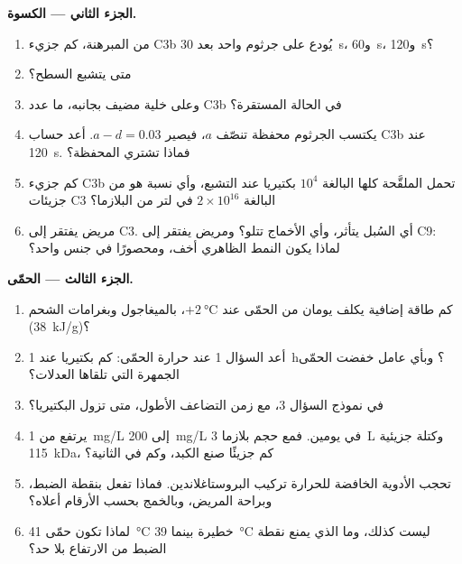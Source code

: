 \begin{problem}
\medskip
\noindent\textbf{الجزء الثاني --- الكسوة.}
\begin{enumerate}[resume]
  \item من المبرهنة، كم جزيء C3b يُودع على جرثوم واحد بعد
        \qty{30}{s}، و\qty{60}{s}، و\qty{120}{s}؟
  \item متى يتشبع السطح؟
  \item وعلى خلية مضيف بجانبه، ما عدد C3b في الحالة
        المستقرة؟
  \item يكتسب الجرثوم محفظة تنصّف $a$، فيصير $a -
        d = 0.03$. أعد حساب C3b عند \qty{120}{s}. فماذا تشتري
        المحفظة؟
  \item كم جزيء C3b تحمل الملقَّحة كلها البالغة $10^{4}$
        بكتيريا عند التشبع، وأي نسبة هو من جزيئات C3 البالغة
        $2\times 10^{16}$ في لتر من البلازما؟
  \item مريض يفتقر إلى C3. أي السُبل يتأثر، وأي الأخماج
        تتلو؟ ومريض يفتقر إلى C9: لماذا يكون النمط الظاهري
        أخف، ومحصورًا في جنس واحد؟
\end{enumerate}

\medskip
\noindent\textbf{الجزء الثالث --- الحمّى.}
\begin{enumerate}[resume]
  \item كم طاقة إضافية يكلف يومان من الحمّى عند
        $+\qty{2}{\celsius}$، بالميغاجول وبغرامات الشحم
        (\qty{38}{kJ/g})؟
  \item أعد السؤال 1 عند حرارة الحمّى: كم بكتيريا عند
        \qty{1}{h}؟ وبأي عامل خفضت الحمّى الجمهرة التي
        تلقاها العدلات؟
  \item في نموذج السؤال 3، مع زمن التضاعف الأطول، متى تزول
        البكتيريا؟
  \item يرتفع  من \qty{1}{mg/L} إلى
        \qty{200}{mg/L} في يومين. فمع حجم بلازما \qty{3}{L}
        وكتلة جزيئية \qty{115}{kDa}، كم جزيئًا صنع الكبد، وكم
        في الثانية؟
  \item تحجب الأدوية الخافضة للحرارة تركيب البروستاغلاندين.
        فماذا تفعل بنقطة الضبط، وبراحة المريض، وبالخمج بحسب
        الأرقام أعلاه؟
  \item لماذا تكون حمّى \qty{41}{\celsius} خطيرة بينما
        \qty{39}{\celsius} ليست كذلك، وما الذي يمنع نقطة
        الضبط من الارتفاع بلا حد؟
\end{enumerate}


\end{problem}
